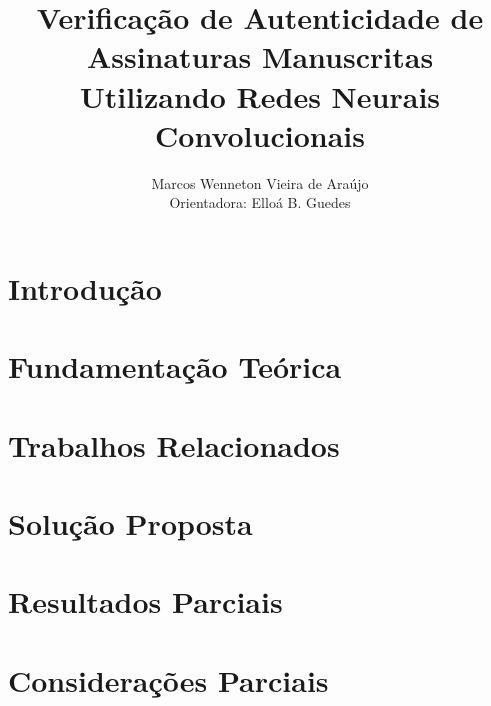 \documentclass[12pt]{article}
\title{Verificação de Autenticidade de Assinaturas Manuscritas\\ Utilizando Redes Neurais Convolucionais}
\author{Marcos Wenneton Vieira de Araújo\\
Orientadora: Elloá B. Guedes}
\begin{document}
\maketitle
\pagestyle{plain} %

\section{Introdução} \label{sec:introducao}


\section{Fundamentação Teórica} \label{sec:fund-teor}


\section{Trabalhos Relacionados} \label{sec:trab-rel}

\section{Solução Proposta} \label{sec:sol-prop}


\section{Resultados Parciais} \label{sec:res-parc}


\section{Considerações Parciais} \label{sec:cons-parc}






\end{document}
